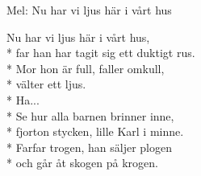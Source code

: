 \begin{SongText}
    \begin{SongInfo}
        Mel: Nu har vi ljus här i vårt hus
    \end{SongInfo}
    \begin{SongVerse}
        Nu har vi ljus här i vårt hus,\\*%
        far han har tagit sig ett duktigt rus.\\*%
        Mor hon är full, faller omkull,\\*%
        välter ett ljus.\\*%
        Ha...\\*%
        Se hur alla barnen brinner inne,\\*%
        fjorton stycken, lille Karl i minne.\\*%
        Farfar trogen, han säljer plogen\\*%
        och går åt skogen på krogen.
    \end{SongVerse}
\end{SongText}
\newpage